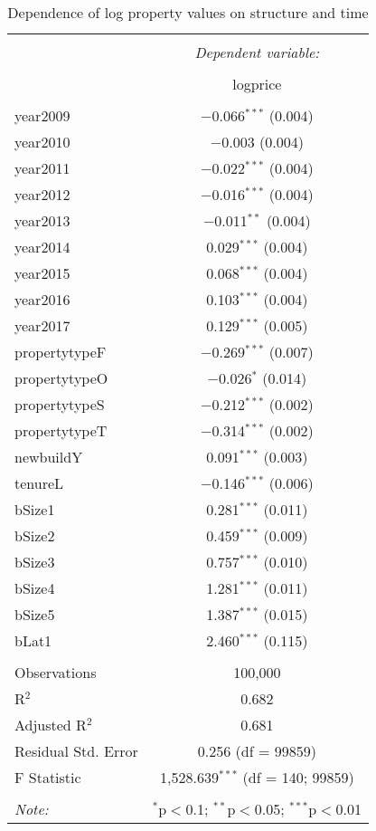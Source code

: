 \documentclass{article}\usepackage[]{graphicx}\usepackage[]{color}
\begin{document}
\begin{table}[!htbp] \centering 
  \caption{Dependence of log property values on structure and time} 
  \label{} 
\begin{tabular}{@{\extracolsep{5pt}}lc} 
\\[-1.8ex]\hline 
\hline \\[-1.8ex] 
 & \multicolumn{1}{c}{\textit{Dependent variable:}} \\ 
\cline{2-2} 
\\[-1.8ex] & logprice \\ 
\hline \\[-1.8ex] 
 year2009 & $-$0.066$^{***}$ (0.004) \\ 
  year2010 & $-$0.003 (0.004) \\ 
  year2011 & $-$0.022$^{***}$ (0.004) \\ 
  year2012 & $-$0.016$^{***}$ (0.004) \\ 
  year2013 & $-$0.011$^{**}$ (0.004) \\ 
  year2014 & 0.029$^{***}$ (0.004) \\ 
  year2015 & 0.068$^{***}$ (0.004) \\ 
  year2016 & 0.103$^{***}$ (0.004) \\ 
  year2017 & 0.129$^{***}$ (0.005) \\ 
  propertytypeF & $-$0.269$^{***}$ (0.007) \\ 
  propertytypeO & $-$0.026$^{*}$ (0.014) \\ 
  propertytypeS & $-$0.212$^{***}$ (0.002) \\ 
  propertytypeT & $-$0.314$^{***}$ (0.002) \\ 
  newbuildY & 0.091$^{***}$ (0.003) \\ 
  tenureL & $-$0.146$^{***}$ (0.006) \\ 
  bSize1 & 0.281$^{***}$ (0.011) \\ 
  bSize2 & 0.459$^{***}$ (0.009) \\ 
  bSize3 & 0.757$^{***}$ (0.010) \\ 
  bSize4 & 1.281$^{***}$ (0.011) \\ 
  bSize5 & 1.387$^{***}$ (0.015) \\ 
  bLat1 & 2.460$^{***}$ (0.115) \\ 
 \hline \\[-1.8ex] 
Observations & 100,000 \\ 
R$^{2}$ & 0.682 \\ 
Adjusted R$^{2}$ & 0.681 \\ 
Residual Std. Error & 0.256 (df = 99859) \\ 
F Statistic & 1,528.639$^{***}$ (df = 140; 99859) \\ 
\hline 
\hline \\[-1.8ex] 
\textit{Note:}  & \multicolumn{1}{r}{$^{*}$p$<$0.1; $^{**}$p$<$0.05; $^{***}$p$<$0.01} \\ 
\end{tabular} 
\end{table} 
\end{document}
